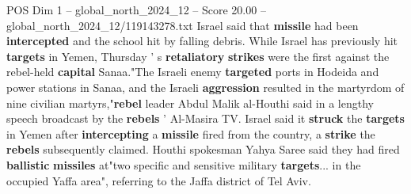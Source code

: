 \begin{textsample}{POS Dim 1 – global\_north\_2024\_12 – Score 20.00 – global\_north\_2024\_12/119143278.txt}
Israel said that \textbf{missile} had been \textbf{intercepted} and the school hit by falling debris.
While Israel has previously hit \textbf{targets} in Yemen, Thursday ' s \textbf{retaliatory} \textbf{strikes} were the first against the rebel-held \textbf{capital} Sanaa."The Israeli enemy \textbf{targeted} ports in Hodeida and power stations in Sanaa, and the Israeli \textbf{aggression} resulted in the martyrdom of nine civilian martyrs,"\textbf{rebel} leader Abdul Malik al-Houthi said in a lengthy speech broadcast by the \textbf{rebels} ' Al-Masira TV.
Israel said it \textbf{struck} the \textbf{targets} in Yemen after \textbf{intercepting} a \textbf{missile} fired from the country, a \textbf{strike} the \textbf{rebels} subsequently claimed.
Houthi spokesman Yahya Saree said they had fired \textbf{ballistic} \textbf{missiles} at"two specific and sensitive military \textbf{targets}... in the occupied Yaffa area", referring to the Jaffa district of Tel Aviv.

\end{textsample}
